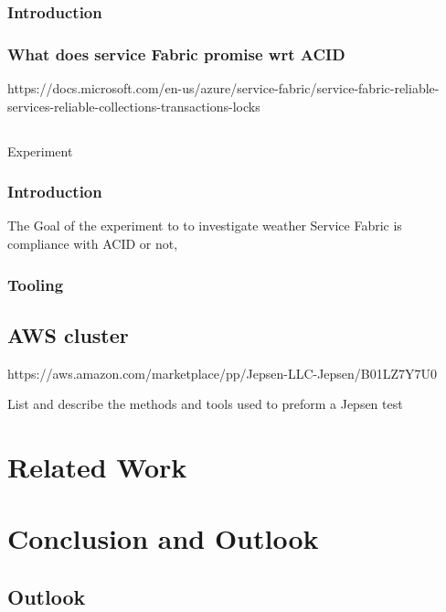 \documentclass[
  a4paper,  %
  twoside,  %
  bibliography=totoc,
  headsepline,
  cleardoublepage=empty,
  parskip=half,
  draft=false
]{scrbook}
\begin{document}
\subsection{Introduction}

\subsection{What does service Fabric promise wrt ACID}

https://docs.microsoft.com/en-us/azure/service-fabric/service-fabric-reliable-services-reliable-collections-transactions-locks


\section{}{Experiment}

\subsection{Introduction}

The Goal of the experiment to to investigate weather Service Fabric is compliance with ACID or not, 


\subsection{Tooling}

\section{AWS cluster}
https://aws.amazon.com/marketplace/pp/Jepsen-LLC-Jepsen/B01LZ7Y7U0


List and describe the methods and tools used to preform a Jepsen test



\chapter{Related Work}

\chapter{Conclusion and Outlook}
\label{chap:zusfas}

\section*{Outlook}
\end{document}
